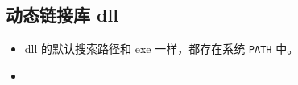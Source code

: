 
\subsection{动态链接库 dll}

\begin{itemize}
\item dll 的默认搜索路径和 exe 一样，都存在系统 \verb`PATH` 中。
\item 
\end{itemize}
